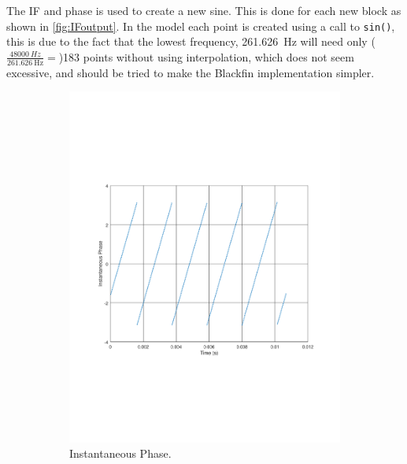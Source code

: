 The IF and phase is used to create a new sine.
This is done for each new block as shown in \cref{fig:IFoutput}.
In the model each point is created using a call to \texttt{sin()}, this is due to the fact that the lowest frequency, \SI{261.626}{\hertz} will need only ($\frac{\SI{48000}{Hz}}{\SI{261.626}{\hertz}}=$)\num{183} points without using interpolation, which does not seem excessive, and should be tried to make the Blackfin implementation simpler.

\begin{figure}
	\centering
	\begin{subfigure}[t]{.5\textwidth}
		\centering
		\includegraphics[width=.9\linewidth, clip, trim={2cm 7cm 2cm 7cm}]{gfx/Modelling/IFIP.pdf}
		\caption{Instantaneous Phase.}
		\label{fig:IFsub1}
	\end{subfigure}%
	\begin{subfigure}[t]{.5\textwidth}
		\centering

\end{subfigure}
\end{figure}
